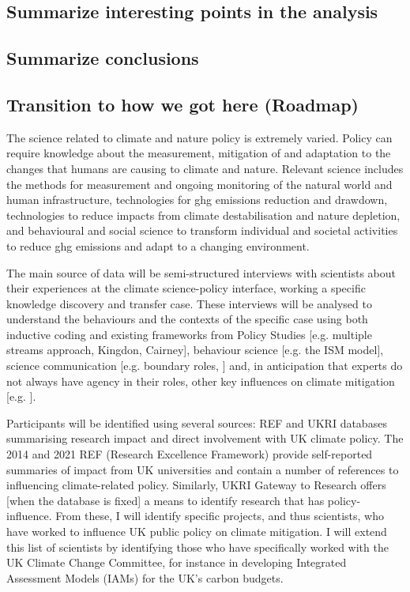 \subsection{Summarize interesting points in the analysis}
\subsection{Summarize conclusions}
\subsection{Transition to how we got here (Roadmap)}


The science related to climate and nature policy is extremely varied. Policy can require knowledge about the measurement, mitigation of and adaptation to the changes that humans are causing to climate and nature. Relevant science includes the methods for measurement and ongoing monitoring of the natural world and human infrastructure, technologies for ghg emissions reduction and drawdown, technologies to reduce impacts from climate destabilisation and nature depletion, and behavioural and social science to transform individual and societal activities to reduce ghg emissions and adapt to a changing environment. 

The main source of data will be semi-structured interviews with scientists about their experiences at the climate science-policy interface, working a specific knowledge discovery and transfer case. These interviews will be analysed to understand the behaviours and the contexts of the specific case using both inductive coding and existing frameworks from Policy Studies [e.g. multiple streams approach, Kingdon, Cairney], behaviour science [e.g. the ISM model], science communication [e.g. boundary roles, \cite{RapleyD2014, GluckmanBK2021}] and, in anticipation that experts do not always have agency in their roles, other key influences on climate mitigation [e.g. \cite{StoddardEtAl2021}].

Participants will be identified using several sources: REF and UKRI databases summarising research impact and direct involvement with UK climate policy. The 2014 and 2021 REF (Research Excellence Framework) provide self-reported summaries of impact from UK universities and contain a number of references to influencing climate-related policy. Similarly, UKRI Gateway to Research offers [when the database is fixed] a means to identify research that has policy-influence. From these, I will identify specific projects, and thus scientists, who have worked to influence UK public policy on climate mitigation. I will extend this list of scientists by identifying those who have specifically worked with the UK Climate Change Committee, for instance in developing Integrated Assessment Models (IAMs) for the UK’s carbon budgets.

